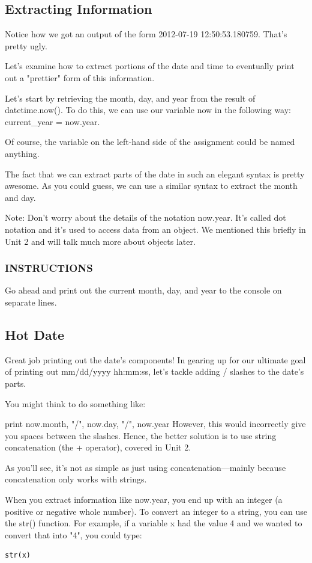 \documentclass[12pt,a4paper,final,twoside,onecolumn,titlepage]{book}
\begin{document}
\subsection{Extracting Information}
Notice how we got an output of the form 2012-07-19 12:50:53.180759. That's pretty ugly.

Let's examine how to extract portions of the date and time to eventually print out a "prettier" form of this information.

Let's start by retrieving the month, day, and year from the result of datetime.now(). To do this, we can use our variable now in the following way: current\_year = now.year.

Of course, the variable on the left-hand side of the assignment could be named anything.

The fact that we can extract parts of the date in such an elegant syntax is pretty awesome. As you could guess, we can use a similar syntax to extract the month and day.

Note: Don't worry about the details of the notation now.year. It's called dot notation and it's used to access data from an object. We mentioned this briefly in Unit 2 and will talk much more about objects later.

\subsubsection{INSTRUCTIONS}
Go ahead and print out the current month, day, and year to the console on separate lines.

\subsection{Hot Date}
Great job printing out the date's components! In gearing up for our ultimate goal of printing out mm/dd/yyyy hh:mm:ss, let's tackle adding / slashes to the date's parts.

You might think to do something like:

print now.month, "/", now.day, "/", now.year
However, this would incorrectly give you spaces between the slashes. Hence, the better solution is to use string concatenation (the + operator), covered in Unit 2.

As you'll see, it's not as simple as just using concatenation—mainly because concatenation only works with strings.

When you extract information like now.year, you end up with an integer (a positive or negative whole number). To convert an integer to a string, you can use the str() function. For example, if a variable x had the value 4 and we wanted to convert that into "4", you could type:
\begin{lstlisting}
str(x)
\end{lstlisting}
\end{document}
